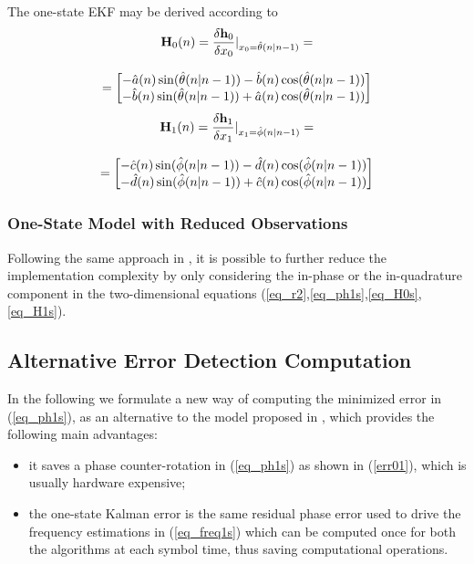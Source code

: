 The one-state EKF may be derived according to
\begin{equation}
\begin{array}{c}
\mathbf{H}_0(n)=\dfrac{\delta \mathbf{h}_0}{\delta x_0}\arrowvert_{x_0=\hat{\theta}(n|n-1)}=\\
\\
=\left[ \begin{matrix} -\hat{a}(n)\sin(\hat{\theta}(n|n-1))-\hat{b}(n)\cos(\hat{\theta}(n|n-1))\\-\hat{b}(n)\sin(\hat{\theta}(n|n-1))+\hat{a}(n)\cos(\hat{\theta}(n|n-1))\end{matrix}\right]
\end{array}
\label{eq_H0s}
\end{equation}
\begin{equation}
\begin{array}{c}
\mathbf{H}_1(n)=\dfrac{\delta \mathbf{h}_1}{\delta x_1}\arrowvert_{x_1=\hat{\phi}(n|n-1)}=\\
\\
=\left[ \begin{matrix} -\hat{c}(n)\sin(\hat{\phi}(n|n-1))-\hat{d}(n)\cos(\hat{\phi}(n|n-1))\\-\hat{d}(n)\sin(\hat{\phi}(n|n-1))+\hat{c}(n)\cos(\hat{\phi}(n|n-1))\end{matrix}\right]
\end{array}
\label{eq_H1s}
\end{equation}

\subsubsection{One-State Model with Reduced Observations}
Following the same approach in \cite{Wei-Tsen}, it is possible to further reduce the implementation complexity by only considering the in-phase or the in-quadrature component in the two-dimensional equations (\ref{eq_r2},\ref{eq_ph1s},\ref{eq_H0s},\ref{eq_H1s}). 

\subsection{Alternative Error Detection Computation}
\label{Kalm2err}
In the following we formulate a new way of computing the minimized error in (\ref{eq_ph1s}), as an alternative to the model proposed in \cite{CommLett}, which provides the following main advantages:
\begin{itemize}
	\item it saves a phase counter-rotation in (\ref{eq_ph1s}) as shown in (\ref{err01}), which is usually hardware expensive;
	\item the one-state Kalman error is the same residual phase error used to drive the frequency estimations in (\ref{eq_freq1s}) which can be computed once for both the algorithms at each symbol time, thus saving computational operations.
\end{itemize}

